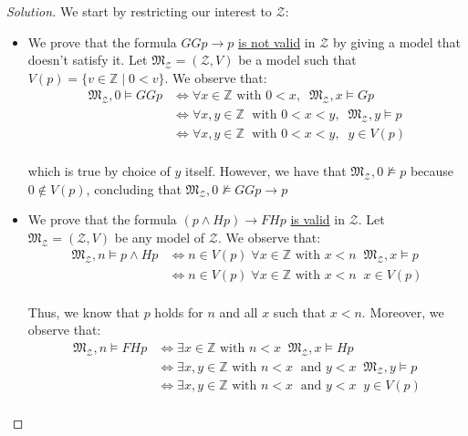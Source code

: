 \documentclass[12pt,a4paper]{report}
\theoremstyle{definition}
\newcommand{\Z}{\mathbb{Z}}                     %
\newcommand{\model}[1]{\mathfrak{#1}}           %
\begin{document}
\begin{proof}[Solution]
        We start by restricting our interest to $\mathcal{Z}$:
        \begin{itemize}
            \item We prove that the formula $GGp \to p$ \underline{is not valid} in $\mathcal{Z}$ by giving a model that doesn't satisfy it. Let $\model{M}_{\mathcal{Z}} = (\mathcal{Z}, V)$ be a model such that $V(p) = \{v \in \Z \mid 0 < v\}$. We observe that:
            \[\begin{split}
                \model{M}_{\mathcal{Z}}, 0 \models GGp & \iff \forall x \in \Z \text{ with } 0 < x, \;\; \model{M}_{\mathcal{Z}}, x \models Gp \\
                & \iff \forall x,y  \in \Z \; \text{ with } 0 < x < y, \;\; \model{M}_{\mathcal{Z}}, y \models p \\ 
                & \iff \forall x,y \in \Z \; \text{ with } 0 < x < y, \;\; y \in V(p) \\ 
            \end{split}\]

            which is true by choice of $y$ itself. However, we have that $\model{M}_{\mathcal{Z}}, 0 \not\models p$ because $0 \notin V(p)$, concluding that $\model{M}_{\mathcal{Z}}, 0 \not\models GGp \to p$

            \item We prove that the formula $(p \land Hp) \to FHp$ \underline{is valid} in $\mathcal{Z}$. Let $\model{M}_{\mathcal{Z}} = (\mathcal{Z}, V)$ be any model of $\mathcal{Z}$. We observe that:
            \[\begin{split}
                \model{M}_{\mathcal{Z}}, n \models p \land Hp & \iff n \in V(p) \; \forall x \in \Z \text{ with } x < n \;\; \model{M}_{\mathcal{Z}}, x \models p \\
                & \iff n \in V(p) \; \forall x \in \Z \text{ with } x < n \;\; x \in V(p) \\
            \end{split}\]
            
            Thus, we know that $p$ holds for $n$ and all $x$ such that $x < n$. Moreover, we observe that:
            \[\begin{split}
                \model{M}_{\mathcal{Z}}, n \models FHp & \iff \exists x \in \Z \text{ with } n < x \;\; \model{M}_{\mathcal{Z}}, x \models Hp \\
                & \iff \exists x,y \in \Z \text{ with } n < x \; \text{ and } y < x \;\;  \model{M}_{\mathcal{Z}}, y \models p \\
                & \iff \exists x,y \in \Z \text{ with } n < x \; \text{ and } y < x \;\; y \in V(p) \\
            \end{split}\]
            

\end{itemize}
\end{proof}
\end{document}
